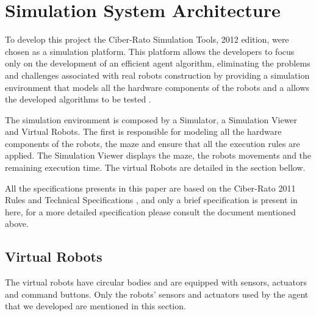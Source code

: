 \documentclass[oribibl]{llncs}
\begin{document}
\section{Simulation System Architecture}
To develop this project the Ciber-Rato Simulation Tools, 2012 edition, were chosen as a simulation platform. This platform allows the developers to focus only on the development of an efficient agent algorithm, eliminating the problems and challenges associated with real robots construction by providing a simulation environment that models all the hardware components of the robots and a allows the developed algorithms to be tested \cite{Lau2002}. 

The simulation environment is composed by a Simulator, a Simulation Viewer and Virtual Robots. The first is responsible for modeling all the hardware components of the robots, the maze and ensure that all the execution rules are applied. The Simulation Viewer displays the maze, the robots movements and the remaining execution time. The virtual Robots are detailed in the section bellow.

All the specifications presents in this paper are based on the Ciber-Rato 2011 Rules and Technical Specifications \cite{DepartamentodeElectronica2011}, and only a brief specification is present in here, for a more detailed specification please consult the document mentioned above.

\subsection{Virtual Robots}
The virtual robots have circular bodies and are equipped with sensors, actuators and command buttons. Only the robots' sensors and actuators used by the agent that we developed are mentioned in this section.
\end{document}
